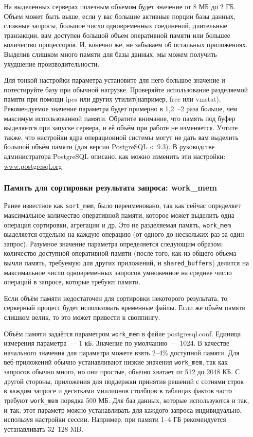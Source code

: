 На выделенных серверах полезным объемом будет значение от 8 МБ до 2 ГБ. Объем может быть выше, если у вас большие активные порции базы данных, сложные запросы, большое число одновременных соединений, длительные транзакции, вам доступен большой объем оперативной памяти или большее количество процессоров. И, конечно же, не забываем об остальных приложениях. Выделив слишком много памяти для базы данных, мы можем получить ухудшение производительности.

Для тонкой настройки параметра установите для него большое значение и потестируйте базу при обычной нагрузке. Проверяйте использование разделяемой памяти при помощи ipcs или других утилит(например, free или vmstat). Рекомендуемое значение параметра будет примерно в 1,2~--2 раза больше, чем максимум использованной памяти. Обратите внимание, что память под буфер выделяется при запуске сервера, и её объём при работе не изменяется. Учтите также, что настройки ядра операционной системы могут не дать вам выделить большой объём памяти (для версии PostgreSQL < 9.3). В руководстве администратора PostgreSQL описано, как можно изменить эти настройки: \href{http://www.postgresql.org/docs/devel/static/kernel-resources.html}{www.postgresql.org}

\subsubsection{Память для сортировки результата запроса: work\_mem}

Ранее известное как \lstinline!sort_mem!, было переименовано, так как сейчас определяет максимальное количество оперативной памяти, которое может выделить одна операция сортировки, агрегации и др. Это не разделяемая память, \lstinline!work_mem! выделяется отдельно на каждую операцию (от одного до нескольких раз за один запрос). Разумное значение параметра определяется следующим образом: количество доступной оперативной памяти (после того, как из общего объема вычли память, требуемую для других приложений, и \lstinline!shared_buffers!) делится на максимальное число одновременных запросов умноженное на среднее число операций в запросе, которые требуют памяти.

Если объём памяти недостаточен для сортировки некоторого результата, то серверный процесс будет использовать временные файлы. Если же объём памяти слишком велик, то это может привести к своппингу.

Объём памяти задаётся параметром \lstinline!work_mem! в файле postgresql.conf. Единица измерения параметра~--- 1 кБ. Значение по умолчанию~--- 1024. В качестве начального значения для параметра можете взять 2--4\% доступной памяти. Для веб-приложений обычно устанавливают низкие значения \lstinline!work_mem!, так как запросов обычно много, но они простые, обычно хватает от 512 до 2048 КБ. С другой стороны, приложения для поддержки принятия решений с сотнями строк в каждом запросе и десятками миллионов столбцов  в таблицах фактов часто требуют \lstinline!work_mem! порядка 500 МБ. Для баз данных, которые используются и так, и так, этот параметр можно устанавливать для каждого запроса индивидуально, используя настройки сессии. Например, при памяти 1--4 ГБ рекомендуется устанавливать 32--128 MB.

